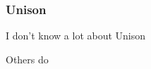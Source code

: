 \begin{frame}
	\frametitle{Unison}
	I don't know a lot about Unison

	Others do
\end{frame}

\begin{frame}

\end{frame}
